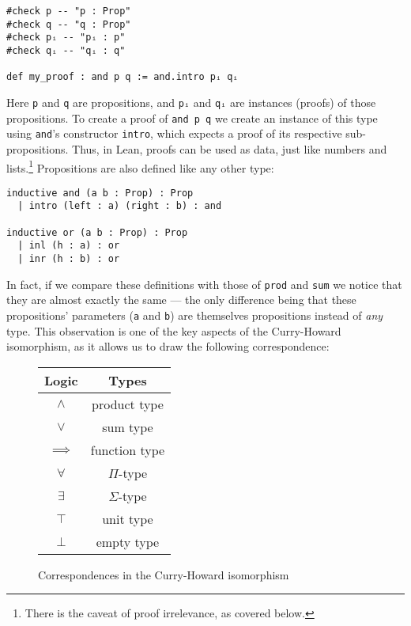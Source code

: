 \begin{lstlisting}
#check p -- "p : Prop"
#check q -- "q : Prop"
#check pᵢ -- "pᵢ : p"
#check qᵢ -- "qᵢ : q"
  
def my_proof : and p q := and.intro pᵢ qᵢ
\end{lstlisting}

\noindent Here \lstinline{p} and \lstinline{q} are propositions, and \lstinline{pᵢ} and \lstinline{qᵢ} are instances (proofs) of those propositions.
To create a proof of \lstinline{and p q} we create an instance of this type using \lstinline{and}'s constructor \lstinline{intro}, which expects a proof of its respective sub-propositions. 
Thus, in Lean, proofs can be used as data, just like numbers and lists.\footnote{
  There is the caveat of proof irrelevance, as covered below.
}
Propositions are also defined like any other type:

\begin{lstlisting}
inductive and (a b : Prop) : Prop 
  | intro (left : a) (right : b) : and

inductive or (a b : Prop) : Prop
  | inl (h : a) : or
  | inr (h : b) : or  
\end{lstlisting}

\noindent In fact, if we compare these definitions with those of \lstinline{prod} and \lstinline{sum} we notice that they are almost exactly the same --- the only difference being that these propositions' parameters (\lstinline{a} and \lstinline{b}) are themselves propositions instead of \emph{any} type.
This observation is one of the key aspects of the Curry-Howard isomorphism, as it allows us to draw the following correspondence:

\begin{figure}[h]
\begin{center}
\begin{tabular}{ |c|c| }
\hline
Logic & Types \\
\hline
$\wedge$ & product type \\
$\vee$ & sum type \\
$\implies$ & function type \\
$\forall$ & $\Pi$-type \\
$\exists$ & $\Sigma$-type \\
$\top$ & unit type \\
$\bot$ & empty type \\
\hline
\end{tabular}
\end{center}
\vspace*{-3mm}
\caption{Correspondences in the Curry-Howard isomorphism}
\end{figure}

